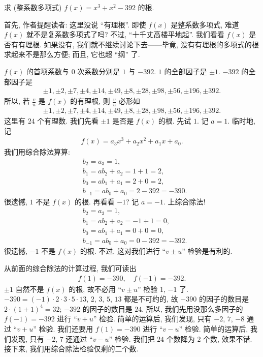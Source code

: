 \begin{example}
    求 (整系数多项式) $f(x) = x^3 + x^2 - 392$ 的根.

    首先, 作者提醒读者: 这里没说 ``有理根''. 即使 $f(x)$ 是整系数多项式, 难道 $f(x)$ 就不是复系数多项式了吗? 不过, ``十千丈高楼平地起''. 我们看看 $f(x)$ 是否有有理根. 如果没有, 我们就不继续讨论下去——毕竟, 没有有理根的多项式的根求起来不是那么方便; 而且, 它也超 ``纲'' 了.

    $f(x)$ 的首项系数与 $0$ 次系数分别是 $1$ 与 $-392$. $1$ 的全部因子是 $\pm 1$. $-392$ 的全部因子是
    \begin{align*}
        {\pm 1}, {\pm 2}, {\pm 7}, {\pm 4}, {\pm 14}, {\pm 49}, {\pm 8}, {\pm 28}, {\pm 98}, {\pm 56}, {\pm 196}, {\pm 392}.
    \end{align*}
    所以, 若 $\frac{v}{u}$ 是 $f(x)$ 的有理根, 则 $\frac{v}{u}$ 必形如
    \begin{align*}
        {\pm 1}, {\pm 2}, {\pm 7}, {\pm 4}, {\pm 14}, {\pm 49}, {\pm 8}, {\pm 28}, {\pm 98}, {\pm 56}, {\pm 196}, {\pm 392}.
    \end{align*}
    这里有 $24$ 个有理数. 我们先看 $\pm 1$ 是否是 $f(x)$ 的根. 先试 $1$. 记 $a = 1$. 临时地, 记
    \begin{align*}
        f(x) = a_3 x^3 + a_2 x^2 + a_1 x + a_0.
    \end{align*}
    我们用综合除法算算:
    \begin{align*}
         & b_2 = a_3 = 1,                         \\
         & b_1 = a b_2 + a_2 = 1 + 1 = 2,         \\
         & b_0 = a b_1 + a_1 = 2 + 0 = 2,         \\
         & b_{-1} = a b_0 + a_0 = 2 - 392 = -390.
    \end{align*}
    很遗憾, $1$ 不是 $f(x)$ 的根. 再看看 $-1$? 记 $a = -1$. 上综合除法!
    \begin{align*}
         & b_2 = a_3 = 1,                         \\
         & b_1 = a b_2 + a_2 = -1 + 1 = 0,        \\
         & b_0 = a b_1 + a_1 = 0 + 0 = 0,         \\
         & b_{-1} = a b_0 + a_0 = 0 - 392 = -392.
    \end{align*}
    很遗憾, $-1$ 不是 $f(x)$ 的根. 不过, 这对我们进行 ``$v \pm u$'' 检验是有利的.

    从前面的综合除法的计算过程, 我们可读出
    \begin{align*}
        f(1) = -390, \quad f(-1) = -392.
    \end{align*}
    $\pm 1$ 自然不是 $f(x)$ 的根, 故不必用 ``$v \pm u$'' 检验 $1$, $-1$ 了. $-390 = (-1) \cdot 2 \cdot 3 \cdot 5 \cdot 13$, $2$, $3$, $5$, $13$ 都是不可约的, 故 $-390$ 的因子的数目是 $2 \cdot (1+1)^4 = 32$; $-392$ 的因子的数目是 $24$. 所以, 我们先用没那么多因子的 $f(-1) = -392$ 进行 ``$v + u$'' 检验. 简单的运算后, 我们发现, 只有 $-2$, $7$, $-8$ 通过 ``$v + u$'' 检验. 我们还要用 $f(1) = -390$ 进行 ``$v - u$'' 检验. 简单的运算后, 我们发现, 只有 $-2$, $7$ 还通过 ``$v - u$'' 检验. 我们把 $24$ 个数降为 $2$ 个数, 效果不错. 接下来, 我们用综合除法检验仅剩的二个数.


\end{example}
